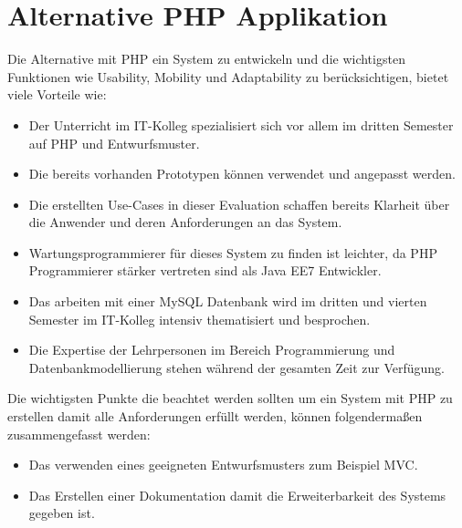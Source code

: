\chapter{Alternative PHP Applikation}
\label{php}
\def \currentAuthor{Peter Pollheimer}
Die Alternative mit PHP ein System zu entwickeln und die wichtigsten Funktionen wie Usability, Mobility und Adaptability zu berücksichtigen, bietet viele Vorteile wie:

\begin{itemize}
	\item Der Unterricht im IT-Kolleg spezialisiert sich vor allem im dritten Semester auf PHP und Entwurfsmuster.
	\item Die bereits vorhanden Prototypen können verwendet und angepasst werden.
	\item Die erstellten Use-Cases in dieser Evaluation schaffen bereits Klarheit über die Anwender und deren Anforderungen an das System.
	\item Wartungsprogrammierer für dieses System zu finden ist leichter, da PHP Programmierer stärker vertreten sind als Java EE7 Entwickler.
	\item Das arbeiten mit einer MySQL Datenbank wird im dritten und vierten Semester im IT-Kolleg intensiv thematisiert und besprochen.
	\item Die Expertise der Lehrpersonen im Bereich Programmierung und Datenbankmodellierung stehen  während der gesamten Zeit zur Verfügung.
\end{itemize}
Die wichtigsten Punkte die beachtet werden sollten um ein System mit PHP zu erstellen damit alle Anforderungen erfüllt werden, können folgendermaßen zusammengefasst werden:
\begin{itemize}
	\item Das verwenden eines geeigneten Entwurfsmusters zum Beispiel MVC.
	\item Das Erstellen einer Dokumentation damit die Erweiterbarkeit des Systems gegeben ist. 
\end{itemize}
